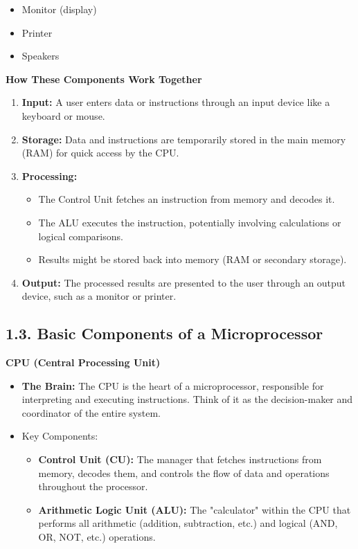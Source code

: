 \documentclass[
]{article}
\begin{document}
\begin{itemize}
  \begin{itemize}
  \item
    Monitor (display)
  \item
    Printer
  \item
    Speakers
  \end{itemize}
\end{itemize}

\textbf{How These Components Work Together}

\begin{enumerate}
\def\labelenumi{\arabic{enumi}.}
\item
  \textbf{Input:} A user enters data or instructions through an input
  device like a keyboard or mouse.
\item
  \textbf{Storage:} Data and instructions are temporarily stored in the
  main memory (RAM) for quick access by the CPU.
\item
  \textbf{Processing:}

  \begin{itemize}
  \item
    The Control Unit fetches an instruction from memory and decodes it.
  \item
    The ALU executes the instruction, potentially involving calculations
    or logical comparisons.
  \item
    Results might be stored back into memory (RAM or secondary storage).
  \end{itemize}
\item
  \textbf{Output:} The processed results are presented to the user
  through an output device, such as a monitor or printer.
\end{enumerate}

\hypertarget{13-basic-components-of-a-microprocessor}{%
\subsection{1.3. Basic Components of a
Microprocessor}\label{13-basic-components-of-a-microprocessor}}

\textbf{CPU (Central Processing Unit)}

\begin{itemize}
\item
  \textbf{The Brain:} The CPU is the heart of a microprocessor,
  responsible for interpreting and executing instructions. Think of it
  as the decision-maker and coordinator of the entire system.
\item
  Key Components:

  \begin{itemize}
  \item
    \textbf{Control Unit (CU):} The manager that fetches instructions
    from memory, decodes them, and controls the flow of data and
    operations throughout the processor.
  \item
    \textbf{Arithmetic Logic Unit (ALU):} The "calculator" within the
    CPU that performs all arithmetic (addition, subtraction, etc.) and
    logical (AND, OR, NOT, etc.) operations.
  \end{itemize}
\end{itemize}
\end{document}

